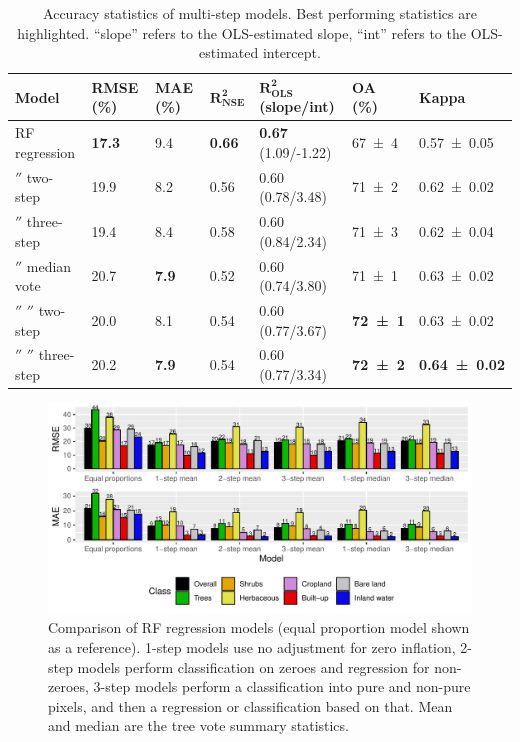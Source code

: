 \documentclass[review,authoryear,3p]{elsarticle}
\begin{document}
\begin{table}
\centering
\begin{tabular}{lllllll}
\toprule
\textbf{Model} & \textbf{\ac{RMSE} (\%)} & \textbf{\ac{MAE} (\%)} & $\mathbf{R^2_{NSE}}$ & $\mathbf{R^2_{OLS}}$ (slope/int) & \textbf{\ac{OA} (\%)} & \textbf{Kappa} \\
\midrule
\Gls{RF} regression
& \textbf{17.3}  & 9.4   & \textbf{0.66}  & \textbf{0.67} (1.09/-1.22) & \num{67\pm4}  & \num{0.57\pm0.05} \\
\ensuremath{''} two-step
& 19.9  & 8.2   & 0.56  & 0.60 (0.78/3.48) & \num{71\pm2}  & \num{0.62\pm0.02} \\
\ensuremath{''} three-step
& 19.4  & 8.4   & 0.58  & 0.60 (0.84/2.34) & \num{71\pm3}  & \num{0.62\pm0.04} \\
\ensuremath{''} median vote
& 20.7  & \textbf{7.9}   & 0.52  & 0.60 (0.74/3.80) & \num{71\pm1}  & \num{0.63\pm0.02} \\
\ensuremath{''} \ensuremath{''} two-step
& 20.0  & 8.1   & 0.54  & 0.60 (0.77/3.67) & \textbf{\num{72\pm1}}  & \num{0.63\pm0.02} \\
\ensuremath{''} \ensuremath{''} three-step
& 20.2  & \textbf{7.9}   & 0.54  & 0.60 (0.77/3.34) & \textbf{\num{72\pm2}}  & \textbf{\num{0.64\pm0.02}} \\
\bottomrule
\end{tabular}
\caption{Accuracy statistics of multi-step models. Best performing statistics are highlighted. ``slope'' refers to the OLS-estimated slope, ``int'' refers to the OLS-estimated intercept.}
\label{tab-accuracy}
\end{table}

\begin{figure}
    \centering
    \includegraphics[width=\textwidth]{article-figures/barplots/2020-06-04-rf-comparison-bar}
    \caption{Comparison of \gls{RF} regression models (equal proportion model shown as a reference). 1-step models use no adjustment for zero inflation, 2-step models perform classification on zeroes and regression for non-zeroes, 3-step models perform a classification into pure and non-pure pixels, and then a regression or classification based on that. Mean and median are the tree vote summary statistics.}
    \label{fig-randomforest}
\end{figure}
\end{document}
